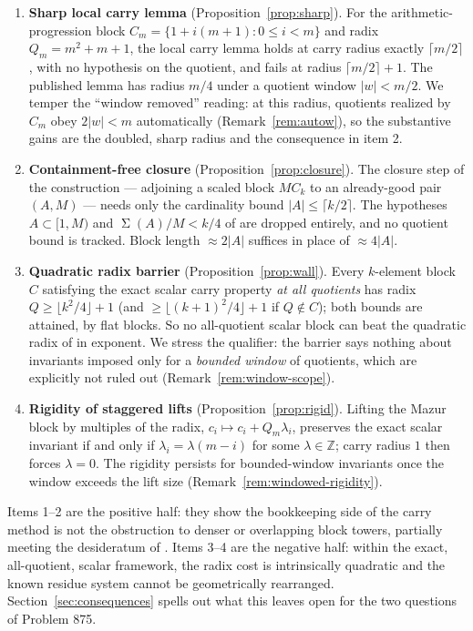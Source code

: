 \documentclass[11pt]{article}
\theoremstyle{definition}
\theoremstyle{remark}
\newcommand{\Z}{\mathbb{Z}}
\DeclareMathOperator{\SSum}{\Sigma}
\begin{document}
\begin{enumerate}
\item \textbf{Sharp local carry lemma} (Proposition~\ref{prop:sharp}). For
the arithmetic-progression block $C_m=\{1+i(m+1):0\le i<m\}$ and radix
$Q_m=m^2+m+1$, the local carry lemma holds at carry radius exactly
$\lceil m/2\rceil$, with no hypothesis on the quotient, and fails at radius
$\lceil m/2\rceil+1$. The published lemma \cite{Mazur26} has radius $m/4$
under a quotient window $|w|<m/2$. We temper the ``window removed''
reading: at this radius, quotients realized by $C_m$ obey $2|w|<m$
automatically (Remark~\ref{rem:autow}), so the substantive gains are the
doubled, sharp radius and the consequence in item 2.
\item \textbf{Containment-free closure} (Proposition~\ref{prop:closure}).
The closure step of the construction --- adjoining a scaled block $MC_k$ to
an already-good pair $(A,M)$ --- needs only the cardinality bound
$|A|\le\lceil k/2\rceil$. The hypotheses $A\subset[1,M)$ and
$\SSum(A)/M<k/4$ of \cite[Lemma~3]{Mazur26} are dropped entirely, and no
quotient bound is tracked. Block length $\approx2|A|$ suffices in place of
$\approx4|A|$.
\item \textbf{Quadratic radix barrier} (Proposition~\ref{prop:wall}).
Every $k$-element block $C$ satisfying the exact scalar carry property
\emph{at all quotients} has radix $Q\ge\lfloor k^2/4\rfloor+1$ (and
$\ge\lfloor(k+1)^2/4\rfloor+1$ if $Q\notin C$); both bounds are attained,
by flat blocks. So no all-quotient scalar block can beat the quadratic
radix of \cite{Mazur26} in exponent. We stress the qualifier: the barrier
says nothing about invariants imposed only for a \emph{bounded window} of
quotients, which are explicitly not ruled out
(Remark~\ref{rem:window-scope}).
\item \textbf{Rigidity of staggered lifts} (Proposition~\ref{prop:rigid}).
Lifting the Mazur block by multiples of the radix,
$c_i\mapsto c_i+Q_m\lambda_i$, preserves the exact scalar invariant if and
only if $\lambda_i=\lambda(m-i)$ for some $\lambda\in\Z$; carry radius $1$
then forces $\lambda=0$. The rigidity persists for bounded-window
invariants once the window exceeds the lift size
(Remark~\ref{rem:windowed-rigidity}).
\end{enumerate}

Items 1--2 are the positive half: they show the bookkeeping side of the
carry method is not the obstruction to denser or overlapping block
towers, partially meeting the desideratum of \cite[Remark~4]{Mazur26}.
Items 3--4 are the negative half: within the exact, all-quotient, scalar
framework, the radix cost is intrinsically quadratic and the known residue
system cannot be geometrically rearranged. Section~\ref{sec:consequences}
spells out what this leaves open for the two questions of Problem 875.
\end{document}
